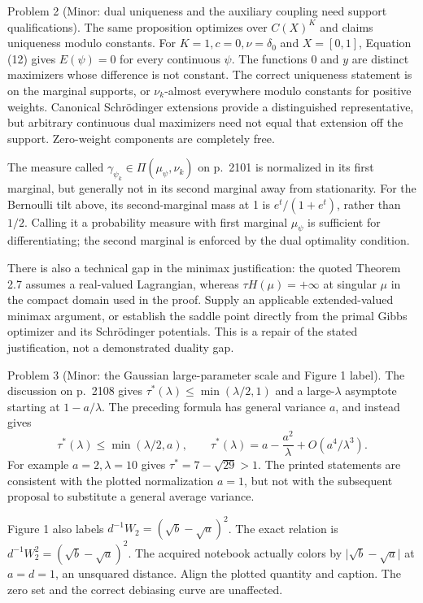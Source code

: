 \documentclass[10pt]{article}
\begin{document}
Problem 2 (Minor: dual uniqueness and the auxiliary coupling need support qualifications).  The same proposition optimizes over \(C(X)^K\) and claims uniqueness modulo constants. For \(K=1,c=0,\nu=\delta_0\) and \(X=[0,1]\), Equation (12) gives \(E(\psi)=0\) for every continuous \(\psi\). The functions \(0\) and \(y\) are distinct maximizers whose difference is not constant. The correct uniqueness statement is on the marginal supports, or \(\nu_k\)-almost everywhere modulo constants for positive weights. Canonical Schrödinger extensions provide a distinguished representative, but arbitrary continuous dual maximizers need not equal that extension off the support. Zero-weight components are completely free.\par
The measure called \(\gamma_{\psi_k}\in\Pi(\mu_\psi,\nu_k)\) on p. 2101 is normalized in its first marginal, but generally not in its second marginal away from stationarity. For the Bernoulli tilt above, its second-marginal mass at 1 is \(e^t/(1+e^t)\), rather than \(1/2\). Calling it a probability measure with first marginal \(\mu_\psi\) is sufficient for differentiating; the second marginal is enforced by the dual optimality condition.\par
There is also a technical gap in the minimax justification: the quoted Theorem 2.7 assumes a real-valued Lagrangian, whereas \(\tau H(\mu)=+\infty\) at singular \(\mu\) in the compact domain used in the proof. Supply an applicable extended-valued minimax argument, or establish the saddle point directly from the primal Gibbs optimizer and its Schrödinger potentials. This is a repair of the stated justification, not a demonstrated duality gap.\par
Problem 3 (Minor: the Gaussian large-parameter scale and Figure 1 label).  The discussion on p. 2108 gives \(\tau^*(\lambda)\le\min(\lambda/2,1)\) and a large-\(\lambda\) asymptote starting at \(1-a/\lambda\). The preceding formula has general variance \(a\), and instead gives \[\tau^*(\lambda)\le\min(\lambda/2,a),\qquad
 \tau^*(\lambda)=a-\frac{a^2}{\lambda}
                 +O(a^4/\lambda^3).\] For example \(a=2,\lambda=10\) gives \(\tau^*=7-\sqrt{29}>1\). The printed statements are consistent with the plotted normalization \(a=1\), but not with the subsequent proposal to substitute a general average variance.\par
Figure 1 also labels \(d^{-1}W_2=(\sqrt b-\sqrt a)^2\). The exact relation is \(d^{-1}W_2^2=(\sqrt b-\sqrt a)^2\). The acquired notebook actually colors by \(\lvert\sqrt b-\sqrt a\rvert\) at \(a=d=1\), an unsquared distance. Align the plotted quantity and caption. The zero set and the correct debiasing curve are unaffected.\par
\end{document}
